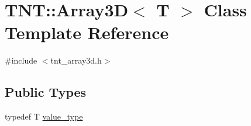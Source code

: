 \hypertarget{classTNT_1_1Array3D}{\section{T\-N\-T\-:\-:Array3\-D$<$ T $>$ Class Template Reference}
\label{classTNT_1_1Array3D}
}


{\ttfamily \#include $<$tnt\-\_\-array3d.\-h$>$}

\subsection*{Public Types}
\begin{DoxyCompactItemize}
\item 
typedef T \hyperlink{classTNT_1_1Array3D_a51945370abf416e829e6a50bdb0af6d5}{value\-\_\-type}
\end{DoxyCompactItemize}
